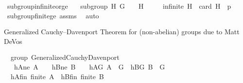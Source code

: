 \begin{isabellebody}
%
\endisadelimproof
\isanewline
{}\isamarkupfalse%
\ subgroup{\isacharunderscore}{\kern0pt}infinite{\isacharunderscore}{\kern0pt}or{\isacharunderscore}{\kern0pt}ge{\isacharcolon}{\kern0pt}\isanewline
\ \ \ {\isachardoublequoteopen}subgroup\ H\ G\ {\isacharparenleft}{\kern0pt}{\isasymcdot}{\isacharparenright}{\kern0pt}\ {\isasymone}{\isachardoublequoteclose}\ \ {\isachardoublequoteopen}H\ {\isasymnoteq}\ {\isacharbraceleft}{\kern0pt}{\isasymone}{\isacharbraceright}{\kern0pt}{\isachardoublequoteclose}\isanewline
\ \ \ {\isachardoublequoteopen}infinite\ H\ {\isasymor}\ card\ H\ {\isasymge}\ p{\isachardoublequoteclose}%
\isadelimproof
\ %
\endisadelimproof
%
\isatagproof
{}\isamarkupfalse%
\ subgroup{\isacharunderscore}{\kern0pt}finite{\isacharunderscore}{\kern0pt}ge\ assms\ \isamarkupfalse%
\ auto%
\endisatagproof
{\isafoldproof}%
%
\isadelimproof
%
\endisadelimproof
\isanewline
\isanewline
{}\isamarkupfalse%
%
\isadelimdocument
%
\endisadelimdocument
%
\isatagdocument
%
\isamarkuptrue%
%
\endisatagdocument
{\isafolddocument}%
%
\isadelimdocument
%
\endisadelimdocument
%
\begin{isamarkuptext}%
Generalized Cauchy--Davenport Theorem for (non-abelian) groups due to Matt DeVos \cite{DeVos2016OnAG}%
\end{isamarkuptext}\isamarkuptrue%
\isamarkupfalse%
\ {\isacharparenleft}{\kern0pt}\ group{\isacharparenright}{\kern0pt}\ Generalized{\isacharunderscore}{\kern0pt}Cauchy{\isacharunderscore}{\kern0pt}Davenport{\isacharcolon}{\kern0pt}\isanewline
\ \ \ hAne{\isacharcolon}{\kern0pt}\ {\isachardoublequoteopen}A\ {\isasymnoteq}\ {\isacharbraceleft}{\kern0pt}{\isacharbraceright}{\kern0pt}{\isachardoublequoteclose}\ \ hBne{\isacharcolon}{\kern0pt}\ {\isachardoublequoteopen}B\ {\isasymnoteq}\ {\isacharbraceleft}{\kern0pt}{\isacharbraceright}{\kern0pt}{\isachardoublequoteclose}\ \ hAG{\isacharcolon}{\kern0pt}\ {\isachardoublequoteopen}A\ {\isasymsubseteq}\ G{\isachardoublequoteclose}\ \ hBG{\isacharcolon}{\kern0pt}\ {\isachardoublequoteopen}B\ {\isasymsubseteq}\ G{\isachardoublequoteclose}\ \isanewline
\ \ hAfin{\isacharcolon}{\kern0pt}\ {\isachardoublequoteopen}finite\ A{\isachardoublequoteclose}\ \ hBfin{\isacharcolon}{\kern0pt}\ {\isachardoublequoteopen}finite\ B{\isachardoublequoteclose}\ \isanewline

\end{isabellebody}
